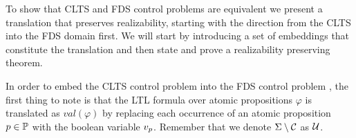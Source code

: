 
To show that CLTS and FDS control problems are equivalent we  present a translation that preserves realizability, starting with the direction from the CLTS into the FDS domain first. We will start by introducing a set of embeddings that constitute the translation and then state and prove a realizability preserving theorem.


In order to embed the CLTS control problem \controlProblemDef into the FDS control problem \fdsEmbeddingDef, the first thing to note is that the LTL formula over atomic propositions $\varphi$ is translated as $val(\varphi)$ by replacing each occurrence of an atomic proposition $p \in \mathbb{P}$ with the boolean variable $v_{p}$. Remember that we denote $\Sigma \setminus \mathcal{C}$ as $\mathcal{U}$. 
%	


